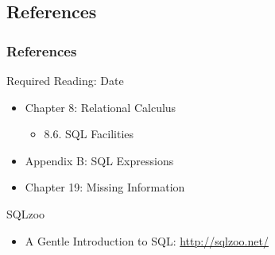 \documentclass[dvipsnames]{beamer}
\theoremstyle{plain}
\begin{document}
\subsection*{References}

\begin{frame}
  \frametitle{References}

  \begin{block}{Required Reading: Date}
    \begin{itemize}
      \item Chapter 8: Relational Calculus
      \begin{itemize}
        \item 8.6. \alert{SQL Facilities}
      \end{itemize}

      \item Appendix B: \alert{SQL Expressions}
      \item Chapter 19: Missing Information
    \end{itemize}
  \end{block}

  \begin{block}{SQLzoo}
    \begin{itemize}
      \item A Gentle Introduction to SQL: \url{http://sqlzoo.net/}
    \end{itemize}
  \end{block}
\end{frame}
\end{document}
